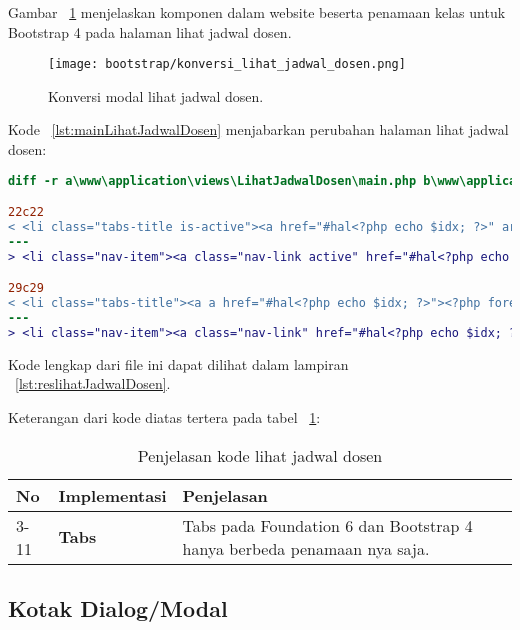 \noindent Gambar ~\ref{fig:konversiLihatJadwalDosen} menjelaskan komponen dalam website beserta penamaan kelas untuk Bootstrap 4 pada halaman lihat jadwal dosen.\\

\begin{figure} [H]
	\centering  
	\texttt{[image: bootstrap/konversi\_lihat\_jadwal\_dosen.png]}
	\caption{Konversi modal lihat jadwal dosen.}
	\label{fig:konversiLihatJadwalDosen}
\end{figure}
Kode ~\ref{lst:mainLihatJadwalDosen} menjabarkan perubahan halaman lihat jadwal dosen:
\begin{lstlisting}[language=diff, caption=Kode untuk Halaman Lihat Jadwal Dosen,  basicstyle=\ttfamily, frame=single,
columns=fullflexible, keepspaces=true, breaklines=true, label={lst:mainLihatJadwalDosen}]
diff -r a\www\application\views\LihatJadwalDosen\main.php b\www\application\views\LihatJadwalDosen\main.php

22c22
< <li class="tabs-title is-active"><a href="#hal<?php echo $idx; ?>" aria-selected="true"><?php foreach ($currRow as $data) {
---
> <li class="nav-item"><a class="nav-link active" href="#hal<?php echo $idx; ?>" aria-selected="true"><?php foreach ($currRow as $data) {

29c29
< <li class="tabs-title"><a a href="#hal<?php echo $idx; ?>"><?php foreach ($currRow as $data) {
---
> <li class="nav-item"><a class="nav-link" href="#hal<?php echo $idx; ?>"><?php foreach ($currRow as $data) {
\end{lstlisting}
Kode lengkap dari file ini dapat dilihat dalam lampiran ~\ref{lst:reslihatJadwalDosen}.

Keterangan dari kode diatas tertera pada tabel ~\ref{tabel:lihatJadwalDosen}:
\begin{table}[H]
	\centering
	\caption{Penjelasan kode lihat jadwal dosen}
	\begin{tabularx}{\textwidth}{llX}
		\toprule
		No & Implementasi     & Penjelasan \\
		\midrule
		3-11 & \textbf{Tabs}  & Tabs pada Foundation 6 dan Bootstrap 4 hanya berbeda penamaan nya saja.\\
		\bottomrule
	\end{tabularx}%
	\label{tabel:lihatJadwalDosen}
\end{table}

\subsection{Kotak Dialog/Modal}
